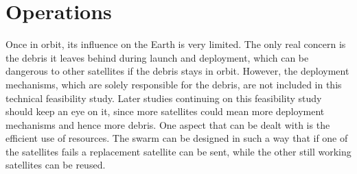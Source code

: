 \section{Operations}
\label{blSSOPE}

Once in orbit, its influence on the Earth is very limited. The only real concern is the debris it leaves behind during launch and deployment, which can be dangerous to other satellites if the debris stays in orbit.
However, the deployment mechanisms, which are solely responsible for the debris, are not included in this technical feasibility study. Later studies continuing on this feasibility study should keep an eye on it, since more satellites could mean more deployment mechanisms and hence more debris.
One aspect that can be dealt with is the efficient use of resources. The swarm can be designed in such a way that if one of the satellites fails a replacement satellite can be sent, while the other still working satellites can be reused.